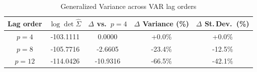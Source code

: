 \begin{table}[htpb]
    \centering
    \renewcommand{\arraystretch}{1.2}
    \caption{Generalized Variance across VAR lag orders}
    \label{tab:generalized_variance}
    \begin{tabular}{ccccc}
    \toprule
    \textbf{Lag order} & \textbf{$\log\det\hat{\Sigma}$} & \textbf{$\Delta$ vs.\ $p=4$} & \textbf{$\Delta$ Variance (\%)} & \textbf{$\Delta$ St.\,Dev.\ (\%)} \\
    \midrule
    $p = 4$ & -103.1111 & 0.0000 & +0.0\% & +0.0\% \\
    $p = 8$ & -105.7716 & -2.6605 & -23.4\% & -12.5\% \\
    $p = 12$ & -114.0426 & -10.9316 & -66.5\% & -42.1\% \\
    \bottomrule
    \end{tabular}
\end{table}
